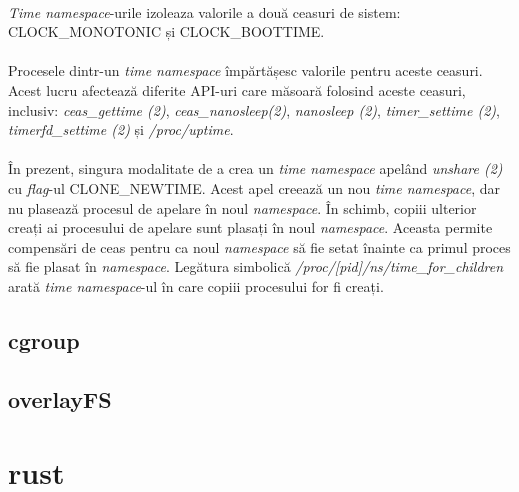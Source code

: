             \paragraph{} \textit{Time namespace}-urile izoleaza valorile a două ceasuri de sistem: CLOCK\_MONOTONIC și CLOCK\_BOOTTIME.\cite{ns:time}
            \paragraph{} Procesele dintr-un \textit{time namespace} împărtășesc valorile pentru aceste ceasuri. Acest lucru afectează diferite API-uri care măsoară folosind aceste ceasuri, inclusiv: \textit{ceas\_gettime (2)}, \textit{ceas\_nanosleep(2)}, \textit{nanosleep (2)}, \textit{timer\_settime (2)}, \textit{timerfd\_settime (2)} și \textit{/proc/uptime}. \cite{ns:time}
            \paragraph{} În prezent, singura modalitate de a crea un \textit{time namespace} apelând \textit{unshare (2)} cu \textit{flag}-ul CLONE\_NEWTIME. Acest apel creează un nou \textit{time namespace}, dar nu plasează procesul de apelare în noul \textit{namespace}. În schimb, copiii ulterior creați ai procesului de apelare sunt plasați în noul \textit{namespace}. Aceasta permite compensări de ceas pentru ca noul \textit{namespace} să fie setat înainte ca primul proces să fie plasat în \textit{namespace}. Legătura simbolică \textit{/proc/[pid]/ns/time\_for\_children} arată \textit{time namespace}-ul în care copiii procesului for fi creați. \cite{ns:time}

    \subsection{cgroup}
    \subsection{overlayFS}
\section{rust}
